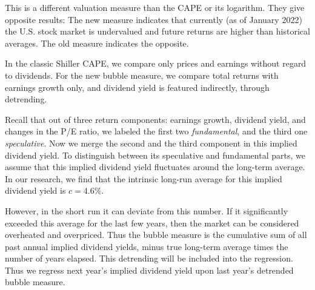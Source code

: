 \documentclass[12pt]{amsart}
\theoremstyle{definition}
\begin{document}
This is a different valuation measure than the CAPE or its logarithm. They give opposite results: The new measure indicates that currently (as of January 2022) the U.S. stock market is undervalued and future returns are higher than historical averages. The old measure indicates the opposite. 

In the classic Shiller CAPE, we compare only prices and earnings without regard to dividends. For the new bubble measure, we compare total returns with earnings growth only, and dividend yield is featured indirectly, through detrending. 

Recall that out of three return components: earnings growth, dividend yield, and changes in the P/E ratio, we labeled the first two {\it fundamental}, and the third one {\it speculative}. Now we merge the second and the third component in this implied dividend yield. To distinguish between its speculative and fundamental parts, we assume that this implied dividend yield fluctuates around the long-term average. In our research, we find that the intrinsic long-run average for this implied dividend yield is $c = 4.6\%$. 

However, in the short run it can deviate from this number. If it significantly exceeded this average for the last few years, then the market can be considered overheated and overpriced. Thus the bubble measure is the cumulative sum of all past annual implied dividend yields, minus true long-term average times the number of years elapsed. This detrending will be included into the regression. Thus we regress next year's implied dividend yield upon last year's detrended bubble measure.
\end{document}
